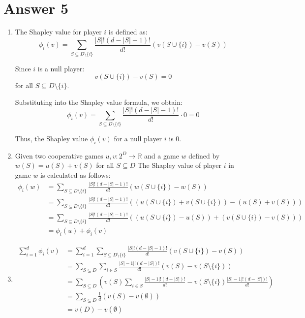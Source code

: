 \documentclass[
	12pt, %
]{fphw}
\begin{document}
\section*{Answer 5}
\begin{enumerate}
	\item The Shapley value for player \(i\) is defined as:
\[ \phi_i(v) = \sum_{S \subseteq D\setminus \{i\}} \frac{|S|!(d - |S| - 1)!}{d!} (v(S \cup \{i\}) - v(S)) \]

Since \(i\) is a null player:
\[ v(S \cup \{i\}) - v(S) = 0 \]
for all \(S \subseteq D\setminus \{i\}\).

Substituting into the Shapley value formula, we obtain:
\[ \phi_i(v) = \sum_{S \subseteq D\setminus \{i\}} \frac{|S|!(d - |S| - 1)!}{d!} \cdot 0 = 0 \]

Thus, the Shapley value \(\phi_i(v)\) for a null player \(i\) is 0.
\item Given two cooperative games \(u, v: 2^D \rightarrow \mathbb{R}\) and a game \(w\) defined by \(w(S) = u(S) + v(S)\) for all \(S \subseteq D\)
The Shapley value of player \(i\) in game \(w\) is calculated as follows:
\begin{align*}
	\phi_i(w) &= \sum_{S \subseteq D \setminus \{i\}} \frac{|S|!(d - |S| - 1)!}{d!} \left(w(S \cup \{i\}) - w(S)\right) \\
	&= \sum_{S \subseteq D \setminus \{i\}} \frac{|S|!(d - |S| - 1)!}{d!} \left((u(S \cup \{i\}) + v(S \cup \{i\})) - (u(S) + v(S))\right) \\
	&= \sum_{S \subseteq D \setminus \{i\}} \frac{|S|!(d - |S| - 1)!}{d!} \left((u(S \cup \{i\}) - u(S)) + (v(S \cup \{i\}) - v(S))\right) \\
	&= \phi_i(u) + \phi_i(v)
	\end{align*}

\item 
\begin{align*}
	\sum_{i=1}^d \phi_i(v) &= \sum_{i=1}^d \sum_{S \subseteq D \setminus \{i\}} \frac{|S|!(d - |S| - 1)!}{d!} \left(v(S \cup \{i\}) - v(S)\right) \\
	&= \sum_{S \subseteq D} \sum_{i \in S} \frac{|S|-1|!(d - |S|)!}{d!} \left(v(S) - v(S \setminus \{i\})\right) \\
	&= \sum_{S \subseteq D} \left(v(S) \sum_{i \in S} \frac{|S|-1|!(d - |S|)!}{d!} - v(S \setminus \{i\}) \frac{|S|-1|!(d - |S|)!}{d!} \right) \\
	&= \sum_{S \subseteq D} \frac{1}{d} \left(v(S) - v(\emptyset)\right) \\
	&= v(D) - v(\emptyset)
	\end{align*}


\end{enumerate}
\end{document}

